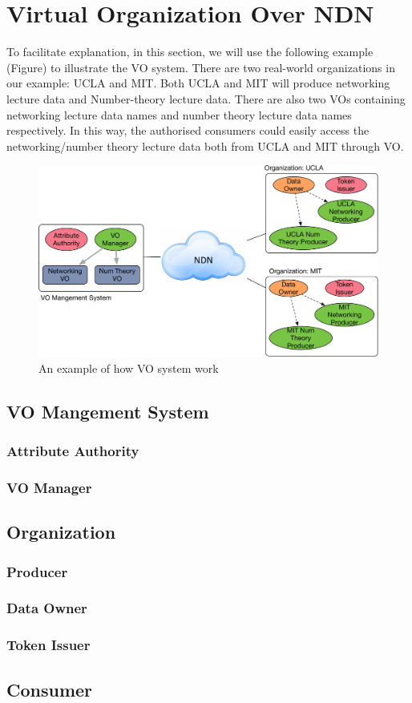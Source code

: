 \section{Virtual Organization Over NDN}

To facilitate explanation, in this section, we will use the following example (Figure) to illustrate the VO system.
There are two real-world organizations in our example: UCLA and MIT.
Both UCLA and MIT will produce networking lecture data and Number-theory lecture data.
There are also two VOs containing networking lecture data names and number theory lecture data names respectively.
In this way, the authorised consumers could easily access the networking/number theory lecture data both from UCLA and MIT through VO.

\begin{figure}[t]
  \centering
  \includegraphics[scale=0.5]{figures/example}
  \vspace{-3mm}
  \caption{An example of how VO system work}
  \label{fig:example}
\end{figure}

\subsection{VO Mangement System}

\subsubsection{Attribute Authority}

\subsubsection{VO Manager}


\subsection{Organization}

\subsubsection{Producer}

\subsubsection{Data Owner}

\subsubsection{Token Issuer}


\subsection{Consumer}